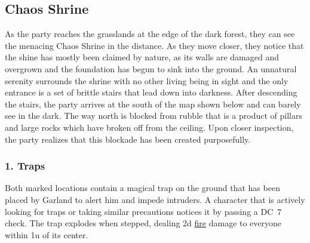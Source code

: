 \subsection*{Chaos Shrine}
As the party reaches the grasslands at the edge of the dark forest, they can see the menacing Chaos Shrine in the distance.
As they move closer, they notice that the shine has mostly been claimed by nature, as its walls are damaged and overgrown and the foundation has begun to sink into the ground.
An unnatural serenity surrounds the shrine with no other living being in sight and the only entrance is a set of brittle stairs that lead down into darkness. 
After descending the stairs, the party arrives at the south of the map shown below and can barely see in the dark.
The way north is blocked from rubble that is a product of pillars and large rocks which have broken off from the ceiling.
Upon closer inspection, the party realizes that this blockade has been created purposefully.
\vspace{0.1cm}

\subsubsection*{1. Traps}
Both marked locations contain a magical trap on the ground that has been placed by Garland to alert him and  impede intruders.
A character that is actively looking for traps or taking similar precautions notices it by passing a DC~7 check. 
The trap explodes when stepped, dealing 2d \hyperlink{type}{fire} damage to everyone within 1u of its center. 

